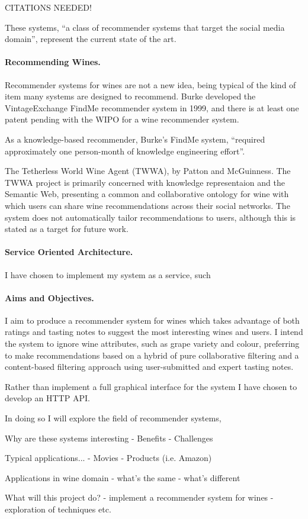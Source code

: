 CITATIONS NEEDED!

These systems, ``a class of recommender systems that target the social media domain''\cite{Guy11}, represent the current state of the art. 

\paragraph{Recommending Wines.}

Recommender systems for wines are not a new idea, being typical of the kind of item many systems are designed to recommend. Burke developed the VintageExchange FindMe recommender system in 1999\cite{Burke99}, and there is at least one patent pending with the WIPO for a wine recommender system\cite{WIPO12}.

As a knowledge-based recommender, Burke's FindMe system, ``required approximately one person-month of knowledge engineering effort''\cite{Burke99b}.

The Tetherless World Wine Agent (TWWA), by Patton and McGuinness\cite{Patton}. The TWWA project is primarily concerned with knowledge representaion and the Semantic Web, presenting a common and collaborative ontology for wine with which users can share wine recommendations across their social networks\cite{TWWAIndex}. The system does not automatically tailor recommendations to users, although this is stated as a target for future work\cite{TWWAIndex}.

\paragraph{Service Oriented Architecture.}

I have chosen to implement my system as a service, such 

\paragraph{Aims and Objectives.}

I aim to produce a recommender system for wines which takes advantage of both ratings and tasting notes to suggest the most interesting wines and users. I intend the system to ignore wine attributes, such as grape variety and colour, preferring to make recommendations based on a hybrid of pure collaborative filtering and a content-based filtering approach using user-submitted and expert tasting notes.

Rather than implement a full graphical interface for the system I have chosen to develop an HTTP API.

In doing so I will explore the field of recommender systems, 

Why are these systems interesting - Benefits - Challenges

Typical applications...  - Movies - Products (i.e. Amazon)

Applications in wine domain - what's the same - what's different

What will this project do?  - implement a recommender system for wines -
exploration of techniques etc.

